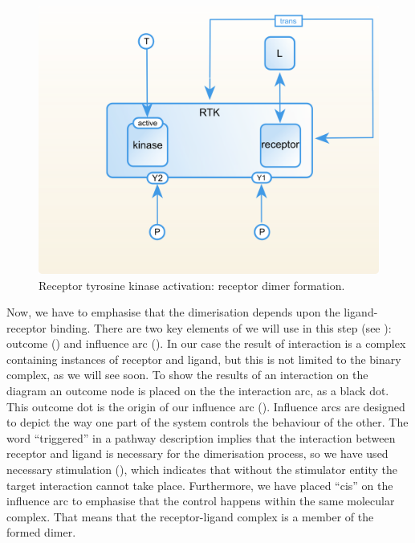 \begin{figure}[H]
  \centering
  \vspace*{-0.75em}
  \includegraphics[scale=0.75]{examples/rtk-dimerisation.png}
   \caption{Receptor tyrosine kinase activation: receptor dimer formation.}
  \label{fig:rtk-dimerisation}
\end{figure}

Now, we have to emphasise that the dimerisation depends upon the ligand-receptor binding. There are two key elements of \SBGNERLone we will use in this step (see ): outcome () and influence arc (). In our case the result of interaction is a complex containing instances of receptor and ligand, but this is not limited to the binary complex, as we will see soon. To show the results of an interaction on the diagram an outcome node is placed on the  the interaction arc, as a black dot. This outcome dot is the origin of our influence arc (). Influence arcs are designed to depict the way one part of the system controls the behaviour of the other. The word ``triggered'' in a pathway description implies that the interaction between receptor and ligand is necessary for the dimerisation process, so we have used necessary stimulation (), which indicates that without the stimulator entity the target interaction cannot take place. Furthermore, we have placed ``cis''  on the influence arc to emphasise that the control happens within the same molecular complex. That means that the receptor-ligand complex is a member of the formed dimer.
 
